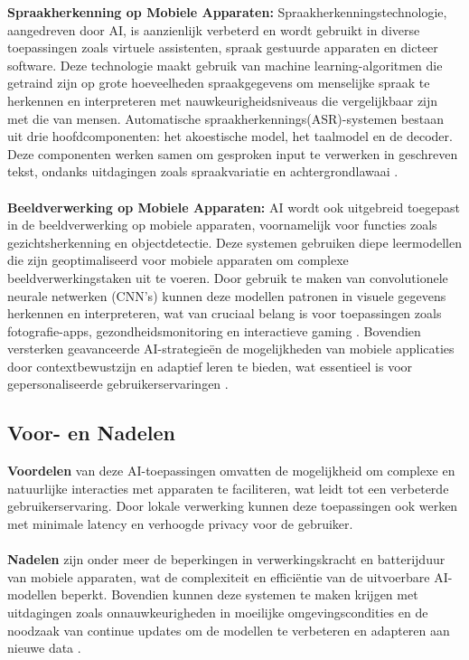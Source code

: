 \textbf{Spraakherkenning op Mobiele Apparaten:}
Spraakherkenningstechnologie, aangedreven door AI, is aanzienlijk verbeterd en wordt gebruikt in diverse toepassingen zoals virtuele assistenten, spraak gestuurde apparaten en dicteer software. De\-ze technologie maakt gebruik van machine learning-algoritmen die getraind zijn op grote hoeveelheden spraakgegevens om menselijke spraak te herkennen en interpreteren met nauwkeurigheidsniveaus die vergelijkbaar zijn met die van mensen. Automatische spraakherkennings(ASR)-systemen bestaan uit drie hoofdcomponenten: het akoestische model, het taalmodel en de decoder. Deze componenten werken samen om gesproken input te verwerken in geschreven tekst, ondanks uitdagingen zoals spraakvariatie en achtergrondlawaai \autocite{Wang2023}.
\\ \\
\textbf{Beeldverwerking op Mobiele Apparaten:}
AI wordt ook uitgebreid toegepast in de beeldverwerking op mobiele apparaten, voornamelijk voor functies zoals gezichtsherkenning en objectdetectie. Deze systemen gebruiken diepe leermodellen die zijn geoptimaliseerd voor mobiele apparaten om complexe beeldverwerkingstaken uit te voeren. Door gebruik te maken van convolutionele neurale netwerken (CNN's) kunnen deze modellen patronen in visuele gegevens herkennen en interpreteren, wat van cruciaal belang is voor toepassingen zoals fotografie-apps, gezondheidsmonitoring en interactieve gaming \autocite{Luo2018}. Bovendien versterken geavanceerde AI-strategieën de mogelijkheden van mobiele applicaties door contextbewustzijn en adaptief leren te bieden, wat essentieel is voor gepersonaliseerde gebruikerservaringen \autocite{Sarker2021}.

\subsection{Voor- en Nadelen}

\textbf{Voordelen} van deze AI-toepassingen omvatten de mogelijkheid om complexe en natuurlijke interacties met apparaten te faciliteren, wat leidt tot een verbeterde gebruikerservaring. Door lokale verwerking kunnen deze toepassingen ook werken met minimale latency en verhoogde privacy voor de gebruiker.
\\ \\
\textbf{Nadelen} zijn onder meer de beperkingen in verwerkingskracht en batterijduur van mobiele apparaten, wat de complexiteit en efficiëntie van de uitvoerbare AI-modellen beperkt. Bovendien kunnen deze systemen te maken krijgen met uitdagingen zoals onnauwkeurigheden in moeilijke omgevingscondities en de noodzaak van continue updates om de modellen te verbeteren en adapteren aan nieuwe data \autocite{Castanyer2021}.


